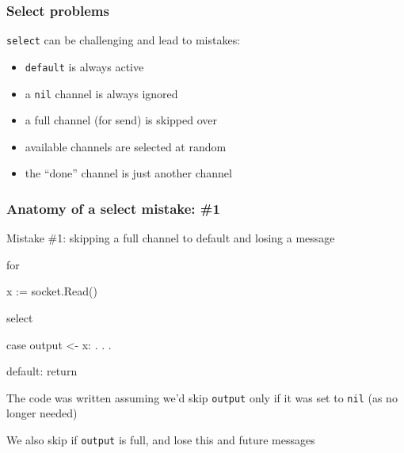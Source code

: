 \documentclass[handout,compress,t,11pt]{beamer}
\begin{document}
\begin{frame}[fragile]
    \frametitle{Select problems}
    \verb|select| can be challenging and lead to mistakes:
    \begin{itemize}
        \item \verb|default| is always active
        \vspace{0.3\baselineskip}
        \item a \verb|nil| channel is always ignored
        \vspace{0.3\baselineskip}
        \item a full channel (for send) is skipped over
        \vspace{0.3\baselineskip}
        \item available channels are selected at random
        \vspace{0.3\baselineskip}
        \item the ``done'' channel is just another channel
    \end{itemize}
\end{frame}

\begin{frame}[fragile]
    \frametitle{Anatomy of a select mistake: \#1}
    Mistake \#1: skipping a full channel to default and losing a message  \par
\begin{golang}
for {
    x := socket.Read()

    select {
    case output <- x:
        . . .
    
    default:
        return
    }
}
\end{golang}
The code was written assuming we'd skip \verb|output| only if it was set to 
\verb|nil| (as no longer needed) \par
\vspace{0.4\baselineskip}
We also skip if \verb|output| is full, and lose this and future messages
\end{frame}
\end{document}
